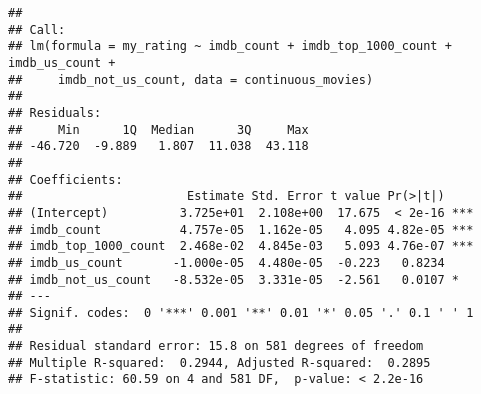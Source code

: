 \documentclass[
]{article}
\newenvironment{Shaded}{\begin{snugshade}}{\end{snugshade}}
\newcommand{\AttributeTok}[1]{\textcolor[rgb]{0.77,0.63,0.00}{#1}}
\newcommand{\DecValTok}[1]{\textcolor[rgb]{0.00,0.00,0.81}{#1}}
\newcommand{\FunctionTok}[1]{\textcolor[rgb]{0.00,0.00,0.00}{#1}}
\newcommand{\NormalTok}[1]{#1}
\newcommand{\SpecialCharTok}[1]{\textcolor[rgb]{0.00,0.00,0.00}{#1}}
\newcommand{\StringTok}[1]{\textcolor[rgb]{0.31,0.60,0.02}{#1}}
\begin{document}
\begin{verbatim}
## 
## Call:
## lm(formula = my_rating ~ imdb_count + imdb_top_1000_count + imdb_us_count + 
##     imdb_not_us_count, data = continuous_movies)
## 
## Residuals:
##     Min      1Q  Median      3Q     Max 
## -46.720  -9.889   1.807  11.038  43.118 
## 
## Coefficients:
##                       Estimate Std. Error t value Pr(>|t|)    
## (Intercept)          3.725e+01  2.108e+00  17.675  < 2e-16 ***
## imdb_count           4.757e-05  1.162e-05   4.095 4.82e-05 ***
## imdb_top_1000_count  2.468e-02  4.845e-03   5.093 4.76e-07 ***
## imdb_us_count       -1.000e-05  4.480e-05  -0.223   0.8234    
## imdb_not_us_count   -8.532e-05  3.331e-05  -2.561   0.0107 *  
## ---
## Signif. codes:  0 '***' 0.001 '**' 0.01 '*' 0.05 '.' 0.1 ' ' 1
## 
## Residual standard error: 15.8 on 581 degrees of freedom
## Multiple R-squared:  0.2944, Adjusted R-squared:  0.2895 
## F-statistic: 60.59 on 4 and 581 DF,  p-value: < 2.2e-16
\end{verbatim}

\begin{Shaded}
\end{Shaded}
\end{document}
